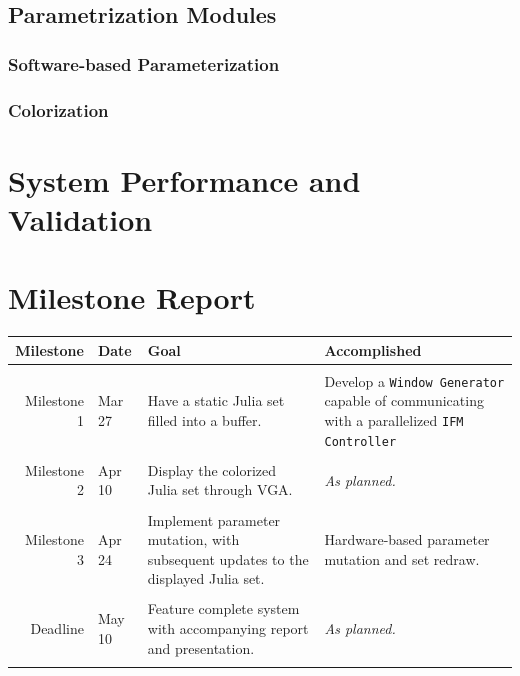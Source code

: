 \documentclass{article}
\begin{document}
\subsection{Parametrization Modules}

\subsubsection{Software-based Parameterization}

\subsubsection{Colorization}



\section{System Performance and Validation}

\section{Milestone Report}

\begin{tabular}{rlp{4.5cm}p{4.5cm}}
\textbf{Milestone}&\textbf{Date}&\textbf{Goal}&\textbf{Accomplished}\\ \hline
&&&\\
Milestone 1&Mar 27&Have a static Julia set filled into a buffer.&
	Develop a \texttt{Window Generator} capable of communicating with a parallelized \texttt{IFM Controller}\\
&&&\\
Milestone 2&Apr 10&Display the colorized Julia set through VGA.&\textit{As planned.}\\
&&&\\
Milestone 3&Apr 24&Implement parameter mutation, with subsequent updates to the displayed Julia set.&
	Hardware-based parameter mutation and set redraw.\\
&&&\\
Deadline&May 10&Feature complete system with accompanying report and presentation.&\textit{As planned.}\\
&&&\\
\end{tabular}
\end{document}
